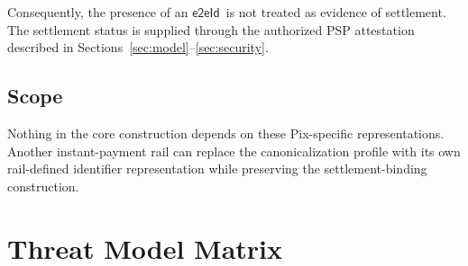 \documentclass[10pt,twocolumn]{article}
\newcommand{\eeid}{\ensuremath{\mathsf{e2eId}}}
\begin{document}
Consequently, the presence of an \eeid\ is not treated as evidence of
settlement. The settlement status is supplied through the authorized PSP
attestation described in Sections~\ref{sec:model}--\ref{sec:security}.

\subsection{Scope}

Nothing in the core construction depends on these Pix-specific
representations. Another instant-payment rail can replace the
canonicalization profile with its own rail-defined identifier
representation while preserving the settlement-binding construction.

\section{Threat Model Matrix}
\label{app:threats}
\end{document}
